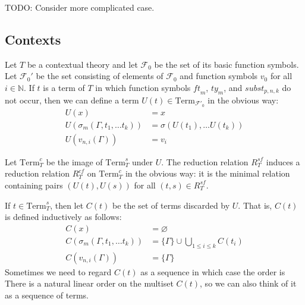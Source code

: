 \documentclass[reqno]{amsart}
\theoremstyle{definition}
\theoremstyle{remark}
\newcommand{\Term}{\mathrm{Term}}
\newcommand{\subst}{\mathit{subst}}
\newcommand{\ft}{\mathit{ft}}
\newcommand{\ty}{\mathit{ty}}
\numberwithin{figure}{section}
\begin{document}
TODO: Consider more complicated case.

\subsection{Contexts}
\label{sec:contexts}

Let $T$ be a contextual theory and let $\mathcal{F}_0$ be the set of its basic function symbols.
Let $\mathcal{F}_0'$ be the set consisting of elements of $\mathcal{F}_0$ and function symbols $v_0$ for all $i \in \mathbb{N}$.
If $t$ is a term of $T$ in which function symbols $\ft_m$, $\ty_m$, and $\subst_{p,n,k}$ do not occur, then we can define a term $U(t) \in \Term_{\mathcal{F}'_0}$ in the obvious way:
\begin{align*}
U(x) & = x \\
U(\sigma_m(\Gamma, t_1, \ldots t_k)) & = \sigma(U(t_1), \ldots U(t_k)) \\
U(v_{n,i}(\Gamma)) & = v_i
\end{align*}

Let $\Term_T^c$ be the image of $\Term_T^s$ under $U$.
The reduction relation $R^{sf}_T$ induces a reduction relation $R^{cf}_T$ on $\Term_T^c$ in the obvious way:
it is the minimal relation containing pairs $(U(t),U(s))$ for all $(t,s) \in R^{sf}_T$.

If $t \in \Term_T^s$, then let $C(t)$ be the set of terms discarded by $U$.
That is, $C(t)$ is defined inductively as follows:
\begin{align*}
C(x) & = \varnothing \\
C(\sigma_m(\Gamma, t_1, \ldots t_k)) & = \{ \Gamma \} \cup \bigcup_{1 \leq i \leq k} C(t_i) \\
C(v_{n,i}(\Gamma)) & = \{ \Gamma \}
\end{align*}
Sometimes we need to regard $C(t)$ as a sequence in which case the order is 
There is a natural linear order on the multiset $C(t)$, so we can also think of it as a sequence of terms.
\end{document}
